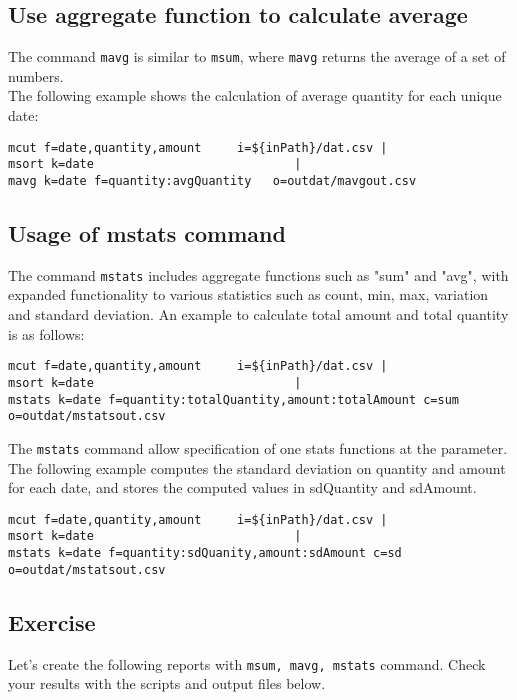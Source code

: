 {\setlength{\parindent}{0cm}

\subsection{Use aggregate function to calculate average}

The command \verb|mavg| is similar to \verb|msum|, where \verb|mavg| returns the average of a set of numbers. \\
The following example shows the calculation of average quantity for each unique date: 

\begin{verbatim}
mcut f=date,quantity,amount     i=${inPath}/dat.csv |
msort k=date                    		|
mavg k=date f=quantity:avgQuantity   o=outdat/mavgout.csv
\end{verbatim}


\subsection{Usage of mstats command }

The command \verb|mstats| includes aggregate functions such as "sum" and "avg", with expanded functionality to various statistics such as count, min, max, variation and standard deviation. An example to calculate total amount and total quantity is as follows: 

\begin{verbatim}
mcut f=date,quantity,amount     i=${inPath}/dat.csv |
msort k=date                    		|
mstats k=date f=quantity:totalQuantity,amount:totalAmount c=sum         o=outdat/mstatsout.csv
\end{verbatim}

The \verb|mstats| command allow specification of one stats functions at the parameter. The following example computes the standard deviation on quantity and amount for each date, and stores the computed values in sdQuantity and sdAmount. 
\begin{verbatim}
mcut f=date,quantity,amount     i=${inPath}/dat.csv |
msort k=date                    		|
mstats k=date f=quantity:sdQuanity,amount:sdAmount c=sd      o=outdat/mstatsout.csv
\end{verbatim}


\subsection{Exercise }

Let's create the following reports with \verb|msum, mavg, mstats| command. Check your results with the scripts and output files below. 

}
